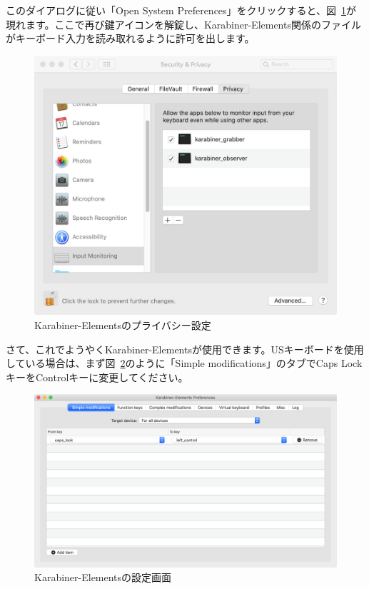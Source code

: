 このダイアログに従い「Open System Preferences」をクリックすると、図~\ref{fig:Karabiner_privacy}が現れます。ここで再び鍵アイコンを解錠し、Karabiner-Elements関係のファイルがキーボード入力を読み取れるように許可を出します。

\begin{figure}
  \centering
  \includegraphics[scale=0.35]{fig/Karabiner_privacy.png}
  \caption{Karabiner-Elementsのプライバシー設定}
  \label{fig:Karabiner_privacy}
\end{figure}

さて、これでようやくKarabiner-Elementsが使用できます。USキーボードを使用している場合は、まず図~\ref{fig:Karabiner_simple}のように「Simple modifications」のタブでCaps LockキーをControlキーに変更してください。

\begin{figure}
  \centering
  \includegraphics[scale=0.35]{fig/Karabiner_simple.png}
  \caption{Karabiner-Elementsの設定画面}
  \label{fig:Karabiner_simple}
\end{figure}

